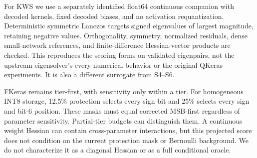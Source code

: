 For KWS we use a separately identified float64 continuous companion with decoded kernels, fixed decoded biases, and no activation requantization. Deterministic symmetric Lanczos targets signed eigenvalues of largest magnitude, retaining negative values. Orthogonality, symmetry, normalized residuals, dense small-network references, and finite-difference Hessian-vector products are checked. This reproduces the scoring forms on validated eigenpairs, not the upstream eigensolver's every numerical behavior or the original QKeras experiments. It is also a different surrogate from S4--S6.

FKeras remains tier-first, with sensitivity only within a tier. For homogeneous INT8 storage, 12.5\% protection selects every sign bit and 25\% selects every sign and bit-6 position. These masks must equal corrected MSB-first regardless of parameter sensitivity. Partial-tier budgets can distinguish them. A continuous weight Hessian can contain cross-parameter interactions, but this projected score does not condition on the current protection mask or Bernoulli background. We do not characterize it as a diagonal Hessian or as a full conditional oracle.
